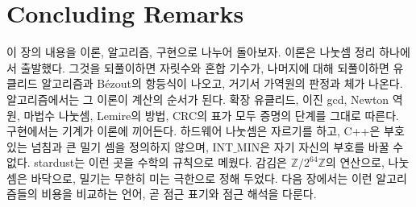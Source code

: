 \section{Concluding Remarks}

이 장의 내용을 이론, 알고리즘, 구현으로 나누어 돌아보자. 이론은 나눗셈 정리 하나에서 출발했다. 그것을 되풀이하면 자릿수와 혼합 기수가, 나머지에 대해 되풀이하면 유클리드 알고리즘과 Bézout의 항등식이 나오고, 거기서 가역원의 판정과 체가 나온다. 알고리즘에서는 그 이론이 계산의 순서가 된다. 확장 유클리드, 이진 gcd, Newton 역원, 마법수 나눗셈, Lemire의 방법, CRC의 표가 모두 증명의 단계를 그대로 따른다. 구현에서는 기계가 이론에 끼어든다. 하드웨어 나눗셈은 자르기를 하고, C++은 부호 있는 넘침과 큰 밀기 셈을 정의하지 않으며, $\mathrm{INT\_MIN}$은 자기 자신의 부호를 바꿀 수 없다. stardust는 이런 곳을 수학의 규칙으로 메웠다. 감김은 $\mathbb{Z}/2^{64}\mathbb{Z}$의 연산으로, 나눗셈은 바닥으로, 밀기는 무한히 미는 극한으로 정해 두었다. 다음 장에서는 이런 알고리즘들의 비용을 비교하는 언어, 곧 점근 표기와 점근 해석을 다룬다.

\chapterreferences
